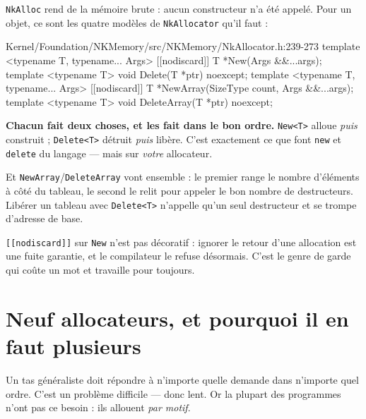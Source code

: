 \texttt{NkAlloc} rend de la mémoire brute : aucun constructeur n'a été appelé.
Pour un objet, ce sont les quatre modèles de \texttt{NkAllocator} qu'il faut :

\begin{nkcode}{Kernel/Foundation/NKMemory/src/NKMemory/NkAllocator.h:239-273}
template <typename T, typename... Args> [[nodiscard]] T *New(Args &&...args);
template <typename T> void Delete(T *ptr) noexcept;
template <typename T, typename... Args> [[nodiscard]] T *NewArray(SizeType count, Args &&...args);
template <typename T> void DeleteArray(T *ptr) noexcept;
\end{nkcode}

\begin{nkretenir}
\textbf{Chacun fait deux choses, et les fait dans le bon ordre.}
\texttt{New<T>} alloue \emph{puis} construit ; \texttt{Delete<T>} détruit
\emph{puis} libère. C'est exactement ce que font \texttt{new} et \texttt{delete}
du langage --- mais sur \emph{votre} allocateur.

Et \texttt{NewArray}/\texttt{DeleteArray} vont ensemble : le premier range le
nombre d'éléments à côté du tableau, le second le relit pour appeler le bon
nombre de destructeurs. Libérer un tableau avec \texttt{Delete<T>} n'appelle
qu'un seul destructeur et se trompe d'adresse de base.
\end{nkretenir}

\begin{nkpiege}
\texttt{[[nodiscard]]} sur \texttt{New} n'est pas décoratif : ignorer le retour
d'une allocation est une fuite garantie, et le compilateur le refuse désormais.
C'est le genre de garde qui coûte un mot et travaille pour toujours.
\end{nkpiege}

\section{Neuf allocateurs, et pourquoi il en faut plusieurs}

Un tas généraliste doit répondre à n'importe quelle demande dans n'importe quel
ordre. C'est un problème difficile --- donc lent. Or la plupart des programmes
n'ont pas ce besoin : ils allouent \emph{par motif}.

